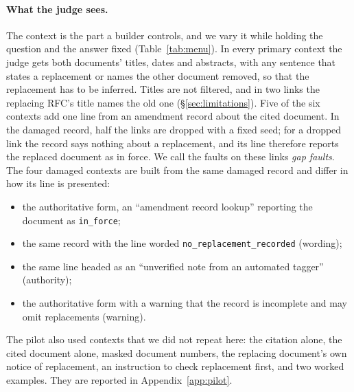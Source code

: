 \paragraph{What the judge sees.}
The context is the part a builder controls, and we vary it while holding the question and the answer fixed
(Table~\ref{tab:menu}). In every primary context the judge gets both documents' titles, dates and abstracts, with any
sentence that states a replacement or names the other document removed, so that the replacement has to be inferred.
Titles are not filtered, and in two links the replacing RFC's title names the old one (\S\ref{sec:limitations}).
Five of the six contexts add one line from an amendment record about the cited document. In the damaged record, half
the links are dropped with a fixed seed; for a dropped link the record says nothing about a replacement, and its line
therefore reports the replaced document as in force. We call the faults on these links \emph{gap faults}. The four
damaged contexts are built from the same damaged record and differ in how its line is presented:
\begin{itemize}
  \item the authoritative form, an ``amendment record lookup'' reporting the document as \texttt{in\_force};
  \item the same record with the line worded \texttt{no\_replacement\_recorded} (wording);
  \item the same line headed as an ``unverified note from an automated tagger'' (authority);
  \item the authoritative form with a warning that the record is incomplete and may omit replacements (warning).
\end{itemize}
The pilot also used contexts that we did not repeat here: the citation alone, the cited document alone, masked document
numbers, the replacing document's own notice of replacement, an instruction to check replacement first, and two worked
examples. They are reported in Appendix~\ref{app:pilot}.

